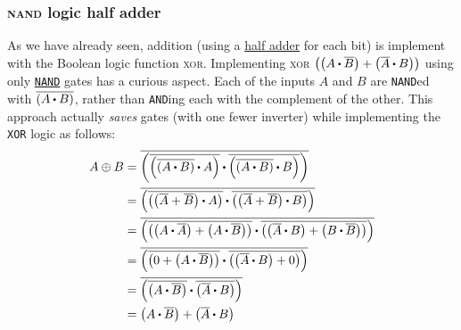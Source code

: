 \documentclass[11pt]{article}%
\begin{document}
\begin{multicols}{2}
\subsubsection{\textsc{nand} logic half adder}
\label{NANDLogicHalfAdder}

As we have already seen, addition (using a \href{https://en.wikipedia.org/wiki/Adder_(electronics)#Half_adder}{half adder} \nocite{wiki:adder-electronics} for each bit) is implement with the Boolean logic function \textsc{xor}. Implementing  \textsc{xor} $\left( \left( {A}\adot\overline{B} \right) + \left( \overline{A}\adot{B} \right) \right)$ using only \href{https://en.wikipedia.org/wiki/Adder_(electronics)#/media/File:Half_adder_using_NAND_gates_only.jpg}{\texttt{NAND}} gates has a curious aspect. Each of the inputs $A$ and $B$ are \texttt{NAND}ed with $\overline{\left( {A}\adot{B} \right)}$, rather than \texttt{AND}ing each with the complement of the other. This approach actually {\em saves} gates (with one fewer inverter) while implementing the \texttt{XOR} logic as follows:
\begin{align*}
A \xor B &= \overline{\left( \overline{\left( \overline{\left( {A}\adot{B} \right)} \adot {A} \right)} \adot \overline{\left( \overline{\left( {A}\adot{B} \right)} \adot {B} \right)} \right) }\\
 &= \overline{\left( \overline{\left( {\left( \overline{A}+\overline{B} \right)} \adot {A} \right)} \adot \overline{\left( \left( \overline{A}+\overline{B} \right) \adot {B} \right)} \right) }\\
 &= \overline{\left( \overline{\left( {\left( {A}\adot\overline{A} \right)} + {\left( {A}\adot\overline{B} \right)} \right)} \adot \overline{\left( {\left( \overline{A}\adot{B} \right)} + {\left( {B}\adot\overline{B} \right)} \right)} \right) }\\
 &= \overline{\left( \overline{\left( 0 + {\left( {A}\adot\overline{B} \right)} \right)} \adot \overline{\left( {\left( \overline{A}\adot{B} \right)} + 0 \right)} \right) }\\
 &= \overline{\left( \overline{\left( {A}\adot\overline{B} \right)} \adot \overline{\left( \overline{A}\adot{B} \right)} \right) }\\
 &= \left( {A}\adot\overline{B} \right) + \left( \overline{A}\adot{B} \right)
\end{align*}

\appendix
\appendixpage
\addappheadtotoc


\end{multicols}
\end{document}

